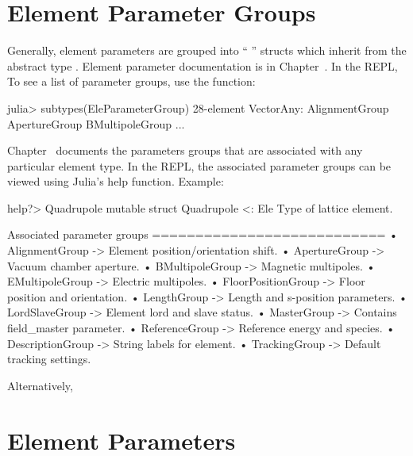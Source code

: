 \section{Element Parameter Groups}
\label{s:ele.groups}

Generally, element parameters are grouped into ``  '' 
structs which inherit from the abstract type . 
Element parameter documentation is in Chapter~. In the REPL,
To see a list of parameter groups, use the  function:
\begin{example}
  julia> subtypes(EleParameterGroup)
  28-element Vector{Any}:
   AlignmentGroup
   ApertureGroup
   BMultipoleGroup
   ...
\end{example}
Chapter~ documents the parameters groups that are associated with any particular element type.
In the REPL, the associated parameter groups can be viewed using Julia's help function. Example: 
\begin{example}
  help?> Quadrupole
    mutable struct Quadrupole <: Ele
    Type of lattice element.

    Associated parameter groups
    ===========================
      •  AlignmentGroup -> Element position/orientation shift.
      •  ApertureGroup -> Vacuum chamber aperture.
      •  BMultipoleGroup -> Magnetic multipoles.
      •  EMultipoleGroup -> Electric multipoles.
      •  FloorPositionGroup -> Floor position and orientation.
      •  LengthGroup -> Length and s-position parameters.
      •  LordSlaveGroup -> Element lord and slave status.
      •  MasterGroup -> Contains field_master parameter.
      •  ReferenceGroup -> Reference energy and species.
      •  DescriptionGroup -> String labels for element.
      •  TrackingGroup -> Default tracking settings.
\end{example}
Alternatively, 

\section{Element Parameters}
\label{s:ele.params}

